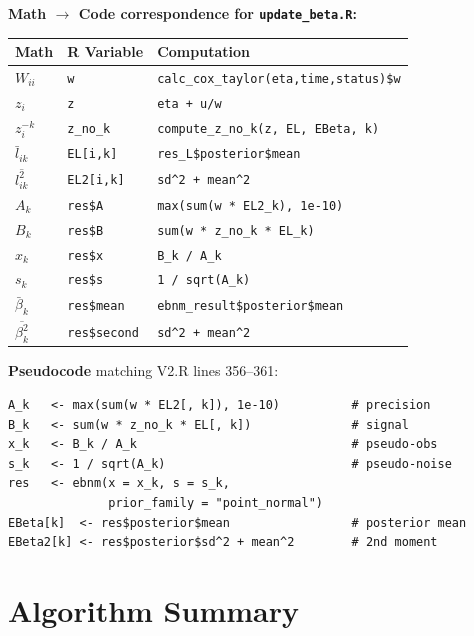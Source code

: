 \documentclass[11pt]{article}
\begin{document}
\begin{codebox}
\textbf{Math $\to$ Code correspondence for \texttt{update\_beta.R}:}

\begin{center}
\begin{tabular}{lll}
\toprule
\textbf{Math} & \textbf{R Variable} & \textbf{Computation} \\
\midrule
$W_{ii}$ & \texttt{w} & \texttt{calc\_cox\_taylor(eta,time,status)\$w} \\
$z_i$ & \texttt{z} & \texttt{eta + u/w} \\
$z_i^{-k}$ & \texttt{z\_no\_k} & \texttt{compute\_z\_no\_k(z, EL, EBeta, k)} \\
$\bar{l}_{ik}$ & \texttt{EL[i,k]} & \texttt{res\_L\$posterior\$mean} \\
$\overline{l^2_{ik}}$ & \texttt{EL2[i,k]} & \texttt{sd\^{}2 + mean\^{}2} \\
$A_k$ & \texttt{res\$A} & \texttt{max(sum(w * EL2\_k), 1e-10)} \\
$B_k$ & \texttt{res\$B} & \texttt{sum(w * z\_no\_k * EL\_k)} \\
$x_k$ & \texttt{res\$x} & \texttt{B\_k / A\_k} \\
$s_k$ & \texttt{res\$s} & \texttt{1 / sqrt(A\_k)} \\
$\bar{\beta}_k$ & \texttt{res\$mean} & \texttt{ebnm\_result\$posterior\$mean} \\
$\overline{\beta^2_k}$ & \texttt{res\$second} & \texttt{sd\^{}2 + mean\^{}2} \\
\bottomrule
\end{tabular}
\end{center}

\textbf{Pseudocode} matching V2.R lines 356--361:
\begin{verbatim}
A_k   <- max(sum(w * EL2[, k]), 1e-10)          # precision
B_k   <- sum(w * z_no_k * EL[, k])              # signal
x_k   <- B_k / A_k                              # pseudo-obs
s_k   <- 1 / sqrt(A_k)                          # pseudo-noise
res   <- ebnm(x = x_k, s = s_k,
              prior_family = "point_normal")
EBeta[k]  <- res$posterior$mean                 # posterior mean
EBeta2[k] <- res$posterior$sd^2 + mean^2        # 2nd moment
\end{verbatim}
\end{codebox}

\section{Algorithm Summary}\label{sec:summary}
\end{document}
